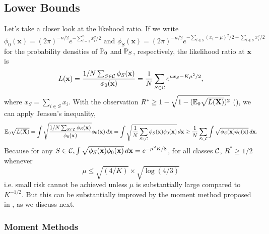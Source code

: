 \documentclass[10pt, oneside]{article}
\begin{document}
\subsection{Lower Bounds}
Let's take a closer look at the likehood ratio. If we write 
\[
\phi_0(\mathbf{x}) = (2\pi)^{-n/2} e^{-\sum_{i=1}^n x_i^2/2} \text{ and }
\phi_S(\mathbf{x}) = (2\pi)^{-n/2} e^{-\sum_{i\in S}(x_i-\mu)^2/2-\sum_{i\notin S} x_i^2/2}
\]
for the
probability densities of $\mathbb{P}_0$ and $\mathbb{P}_S$, respectively,
the likelihood ratio at $\mathbf{x}$ is
\[
L(\mathbf{x})
= \frac{{1/N}\sum_{S\in{\mathcal C}} \phi_S(\mathbf{x})}{\phi
_0(\mathbf{x})}
= \frac{1}{N} \sum_{S\in{\mathcal C}}
e^{\mu x_S - K\mu^2/2},
\]
where $x_S = \sum_{i\in S} x_i$. With the observation $R^* \ge 1 - \sqrt{1 - (\mathbb{E}_0 \sqrt{L(\mathbf{X})})^2}$ (\cite{devroye2013probabilistic}),
we can apply Jensen's inequality, 
\[
\mathbb{E}_0 \sqrt{L(\mathbf{X})} = \int\sqrt{\frac{{1/N}\sum_{S\in{\mathcal C}} \phi_S(\mathbf{x})}{\phi
_0(\mathbf{x})}} \phi
_0(\mathbf{x}) \,d\mathbf{x}
= \int\sqrt{\frac{1}{N} \sum_{S\in{\mathcal C}} \phi_S(\mathbf{x}) \phi
_0(\mathbf{x})} \,d\mathbf{x}
\ge\frac{1}{N} \sum_{S\in{\mathcal C}}
\int\sqrt{ \phi_S(\mathbf{x}) \phi_0(\mathbf{x})} \,d\mathbf{x}.
\] 
Because for any $S\in{\mathcal C}, \int\sqrt{ \phi_S(\mathbf{x}) \phi_0(\mathbf{x})} \,d\mathbf{x}=e^{-\mu^2K/8}$, for all classes ${\mathcal C}$, $R^* \ge1/2$ whenever
\begin{equation}
  \label{eq: loose lower bound}
  \mu\le\sqrt{(4/K)}\times\sqrt{\log(4/3)}
\end{equation}
i.e. small risk cannot be achieved unless $\mu$ is substantially large compared to $K^{-1/2}$. But this can be substantially improved by the moment method proposed in \cite{addario2010combinatorial}, as we discuss next.

%
\subsubsection{Moment Methods}
\label{subsubsec:Moment Methods}
%
\end{document}
